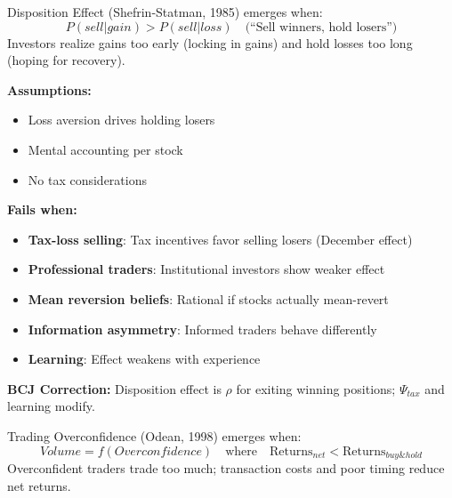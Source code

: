 \begin{theorem}
\label{thm:disposition-effect}
Disposition Effect (Shefrin-Statman, 1985) emerges when:
\begin{equation}
\boxed{P(sell | gain) > P(sell | loss) \quad \text{(``Sell winners, hold losers'')}}
\end{equation}
Investors realize gains too early (locking in gains) and hold losses too long (hoping for recovery).
\end{theorem}

\begin{tcolorbox}[colback=red!5!white, colframe=red!75!black, title=Boundary Condition: Where Disposition Effect Fails]
\textbf{Assumptions:}
\begin{itemize}[nosep]
\item Loss aversion drives holding losers
\item Mental accounting per stock
\item No tax considerations
\end{itemize}

\textbf{Fails when:}
\begin{itemize}[nosep]
\item \textbf{Tax-loss selling}: Tax incentives favor selling losers (December effect)
\item \textbf{Professional traders}: Institutional investors show weaker effect
\item \textbf{Mean reversion beliefs}: Rational if stocks actually mean-revert
\item \textbf{Information asymmetry}: Informed traders behave differently
\item \textbf{Learning}: Effect weakens with experience
\end{itemize}

\textbf{BCJ Correction:} Disposition effect is $\rho$ for exiting winning positions; $\Psi_{tax}$ and learning modify.
\end{tcolorbox}


\begin{theorem}
\label{thm:overconfidence-trading}
Trading Overconfidence (Odean, 1998) emerges when:
\begin{equation}
\boxed{Volume = f(Overconfidence) \quad \text{where} \quad \text{Returns}_{net} < \text{Returns}_{buy\&hold}}
\end{equation}
Overconfident traders trade too much; transaction costs and poor timing reduce net returns.
\end{theorem}

